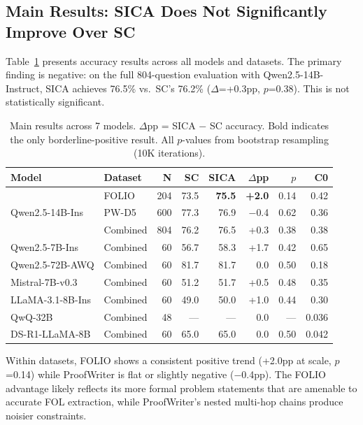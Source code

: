 \documentclass[11pt,a4paper]{article}
\begin{document}
\subsection{Main Results: SICA Does Not Significantly Improve Over SC}

Table~\ref{tab:main} presents accuracy results across all models and datasets. The primary finding is negative: on the full 804-question evaluation with Qwen2.5-14B-Instruct, SICA achieves 76.5\% vs.\ SC's 76.2\% ($\Delta$=+0.3pp, $p$=0.38). This is not statistically significant.

\begin{table}[t]
\centering
\small
\caption{Main results across 7 models. $\Delta$pp = SICA $-$ SC accuracy. Bold indicates the only borderline-positive result. All $p$-values from bootstrap resampling (10K iterations).}
\label{tab:main}
\begin{tabular}{llrrrrrr}
\toprule
\textbf{Model} & \textbf{Dataset} & \textbf{N} & \textbf{SC} & \textbf{SICA} & \textbf{$\Delta$pp} & \textbf{$p$} & \textbf{C0} \\
\midrule
\multirow{3}{*}{Qwen2.5-14B-Ins} & FOLIO & 204 & 73.5 & \textbf{75.5} & \textbf{+2.0} & 0.14 & 0.42 \\
 & PW-D5 & 600 & 77.3 & 76.9 & $-$0.4 & 0.62 & 0.36 \\
 & Combined & 804 & 76.2 & 76.5 & +0.3 & 0.38 & 0.38 \\
\midrule
Qwen2.5-7B-Ins & Combined & 60 & 56.7 & 58.3 & +1.7 & 0.42 & 0.65 \\
Qwen2.5-72B-AWQ & Combined & 60 & 81.7 & 81.7 & 0.0 & 0.50 & 0.18 \\
\midrule
Mistral-7B-v0.3 & Combined & 60 & 51.2 & 51.7 & +0.5 & 0.48 & 0.35 \\
LLaMA-3.1-8B-Ins & Combined & 60 & 49.0 & 50.0 & +1.0 & 0.44 & 0.30 \\
\midrule
QwQ-32B & Combined & 48 & --- & --- & 0.0 & --- & 0.036 \\
DS-R1-LLaMA-8B & Combined & 60 & 65.0 & 65.0 & 0.0 & 0.50 & 0.042 \\
\bottomrule
\end{tabular}
\end{table}

Within datasets, FOLIO shows a consistent positive trend (+2.0pp at scale, $p$=0.14) while ProofWriter is flat or slightly negative ($-$0.4pp). The FOLIO advantage likely reflects its more formal problem statements that are amenable to accurate FOL extraction, while ProofWriter's nested multi-hop chains produce noisier constraints.
\end{document}
